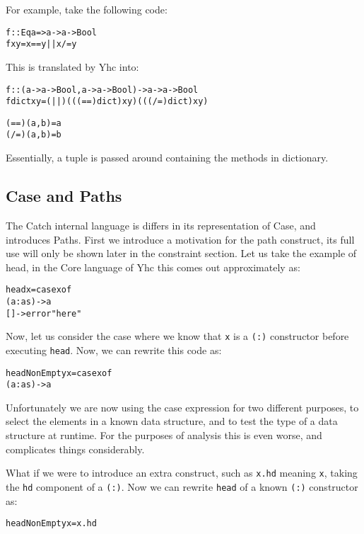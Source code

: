 \documentclass[preprint]{sigplanconf}
\newcommand{\T}[1]{\texttt{#1}}
\newenvironment{code}{\begin{alltt}\small}{\end{alltt}}
\begin{document}
For example, take the following code:

\begin{code}
 f :: Eq a => a -> a -> Bool
 f x y = x == y || x /= y
\end{code}

This is translated by Yhc into:

\begin{code}
 f :: (a -> a -> Bool, a -> a -> Bool) -> a -> a -> Bool
 f dict x y = (||) (((==) dict) x y) (((/=) dict) x y)

 (==) (a,b) = a
 (/=) (a,b) = b
\end{code}

Essentially, a tuple is passed around containing the methods in dictionary.


\subsection{Case and Paths}

The Catch internal language is differs in its representation of Case, and
introduces Paths. First we introduce a motivation for the path construct, its
full use will only be shown later in the constraint section. Let us take the
example of head, in the Core language of Yhc this comes out approximately as:

\begin{code}
head x = case x of
            (a:as) -> a
            [] -> error "here"
\end{code}

Now, let us consider the case where we know that \T{x} is a \T{(:)} constructor
before executing \T{head}. Now, we can rewrite this code as:

\begin{code}
 headNonEmpty x = case x of
                     (a:as) -> a
\end{code}

Unfortunately we are now using the case expression for two different purposes,
to select the elements in a known data structure, and to test the type of a
data structure at runtime. For the purposes of analysis this is even worse, and
complicates things considerably.

What if we were to introduce an extra construct, such as \T{x.hd} meaning
\T{x}, taking the \T{hd} component of a \T{(:)}. Now we can rewrite \T{head} of
a known \T{(:)} constructor as:

\begin{code}
 headNonEmpty x = x.hd
\end{code}
\end{document}
